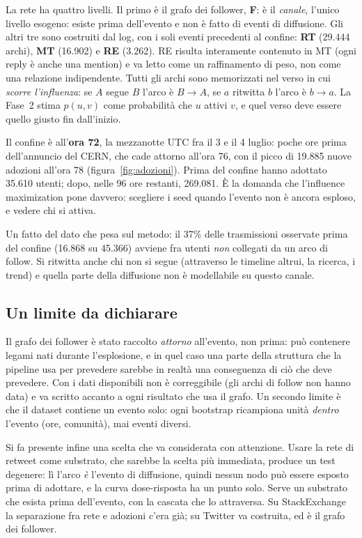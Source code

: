 \documentclass[11pt,a4paper]{article}
\begin{document}
La rete ha quattro livelli. Il primo è il grafo dei follower, \textbf{F}: è il \emph{canale}, l'unico livello esogeno: esiste prima dell'evento e non è fatto di eventi di diffusione. Gli altri tre sono costruiti dal log, con i soli eventi precedenti al confine: \textbf{RT} (29.444 archi), \textbf{MT} (16.902) e \textbf{RE} (3.262). RE risulta interamente contenuto in MT (ogni reply è anche una mention) e va letto come un raffinamento di peso, non come una relazione indipendente. Tutti gli archi sono memorizzati nel verso in cui \emph{scorre l'influenza}: se $A$ segue $B$ l'arco è $B \to A$, se $a$ ritwitta $b$ l'arco è $b \to a$. La Fase~2 stima $p(u,v)$ come probabilità che $u$ attivi $v$, e quel verso deve essere quello giusto fin dall'inizio.

Il confine è all'\textbf{ora 72}, la mezzanotte UTC fra il 3 e il 4 luglio: poche ore prima dell'annuncio del CERN, che cade attorno all'ora 76, con il picco di 19.885 nuove adozioni all'ora 78 (figura~\ref{fig:adozioni}). Prima del confine hanno adottato 35.610 utenti; dopo, nelle 96 ore restanti, 269.081. È la domanda che l'influence maximization pone davvero: scegliere i seed quando l'evento non è ancora esploso, e vedere chi si attiva.

Un fatto del dato che pesa sul metodo: il 37\% delle trasmissioni osservate prima del confine (16.868 su 45.366) avviene fra utenti \emph{non} collegati da un arco di follow. Si ritwitta anche chi non si segue (attraverso le timeline altrui, la ricerca, i trend) e quella parte della diffusione non è modellabile su questo canale.

\subsection{Un limite da dichiarare}
Il grafo dei follower è stato raccolto \emph{attorno} all'evento, non prima: può contenere legami nati durante l'esplosione, e in quel caso una parte della struttura che la pipeline usa per prevedere sarebbe in realtà una conseguenza di ciò che deve prevedere. Con i dati disponibili non è correggibile (gli archi di follow non hanno data) e va scritto accanto a ogni risultato che usa il grafo. Un secondo limite è che il dataset contiene un evento solo: ogni bootstrap ricampiona unità \emph{dentro} l'evento (ore, comunità), mai eventi diversi.

Si fa presente infine una scelta che va considerata con attenzione. Usare la rete di retweet come substrato, che sarebbe la scelta più immediata, produce un test degenere: lì l'arco \emph{è} l'evento di diffusione, quindi nessun nodo può essere esposto prima di adottare, e la curva dose-risposta ha un punto solo. Serve un substrato che esista prima dell'evento, con la cascata che lo attraversa. Su StackExchange la separazione fra rete e adozioni c'era già; su Twitter va costruita, ed è il grafo dei follower.
\end{document}
